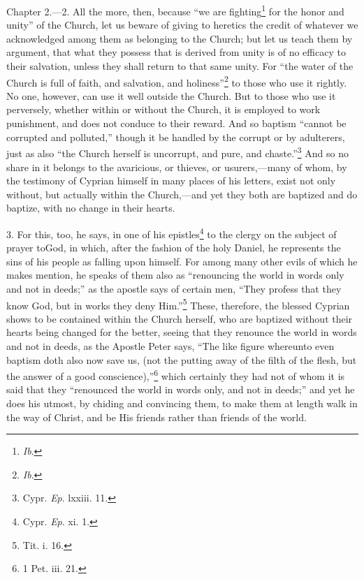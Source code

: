 
Chapter 2.—2. All the more, then, because ``we are fighting\footnote{\par  \emph{Ib}.} for the honor and unity'' of the Church, let us beware of giving to heretics the credit of whatever we acknowledged among them as belonging to the Church; but let us teach them by argument, that what they possess that is derived from unity is of no efficacy to their salvation, unless they shall return to that same unity. For ``the water of the Church is full of faith, and salvation, and holiness''\footnote{\par  \emph{Ib}.} to those who use it rightly. No one, however, can use it well outside the Church. But to those who use it perversely, whether within or without the Church, it is employed to work punishment, and does not conduce to their reward. And so baptism ``cannot be corrupted and polluted,'' though it be handled by the corrupt or by adulterers, just as also ``the Church herself is uncorrupt, and pure, and chaste.''\footnote{\par  Cypr. \emph{Ep}. lxxiii. 11.} And so no share in it belongs to the avaricious, or thieves, or usurers,—many of whom, by the testimony of Cyprian himself in many places of his letters, exist not only without, but actually within the Church,—and yet they both are baptized and do baptize, with no change in their hearts.

3. For this, too, he says, in one of his epistles\footnote{\par  Cypr. \emph{Ep}. xi. 1.} to the clergy on the subject of prayer toGod, in which, after the fashion of the holy Daniel, he represents the sins of his people as falling upon himself. For among many other evils of which he makes mention, he speaks of them also as ``renouncing the world in words only and not in deeds;'' as the apostle says of certain men, ``They profess that they know God, but in works they deny Him.''\footnote{\par  Tit. i. 16.} These, therefore, the blessed Cyprian shows to be contained within the Church herself, who are baptized without their hearts being changed for the better, seeing that they renounce the world in words and not in deeds, as the Apostle Peter says, ``The like figure whereunto even baptism doth also now save us, (not the putting away of the filth of the flesh, but the answer of a good conscience),''\footnote{\par  1 Pet. iii. 21.} which certainly they had not of whom it is said that they ``renounced the world in words only, and not in deeds;'' and yet he does his utmost, by chiding and convincing them, to make them at length walk in the way of Christ, and be His friends rather than friends of the world.

